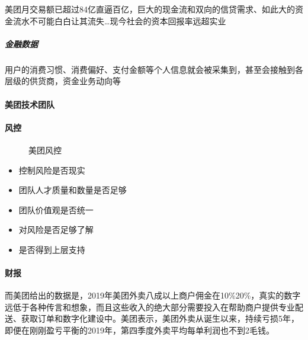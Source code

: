 \documentclass[letterpaper,11pt,english]{sphinxmanual}
\begin{document}
美团月交易额已超过84亿直逼百亿，巨大的现金流和双向的信贷需求、如此大的资金流水不可能白白让其流失…现今社会的资本回报率远超实业%
\begin{footnote}[925]\sphinxAtStartFootnote
{}
%
\end{footnote}


\subparagraph{金融数据}
\label{\detokenize{chapter_company/meituan:id16}}
用户的消费习惯、消费偏好、支付金额等个人信息就会被采集到，甚至会接触到各层级的供货商，资金业务动向等%
\begin{footnote}[926]\sphinxAtStartFootnote
{}
%
\end{footnote}


\paragraph{美团技术团队}
\label{\detokenize{chapter_company/meituan:id17}}


\paragraph{风控}
\label{\detokenize{chapter_company/meituan:id18}}
\begin{figure}[H]
\centering
\capstart

\noindent{}
\caption{美团风控}\label{\detokenize{chapter_company/meituan:id28}}\label{\detokenize{chapter_company/meituan:id19}}\end{figure}
\begin{itemize}
\item {} 
控制风险是否现实

\item {} 
团队人才质量和数量是否足够

\item {} 
团队价值观是否统一

\item {} 
对风险是否足够了解

\item {} 
是否得到上层支持

\end{itemize}


\paragraph{财报}
\label{\detokenize{chapter_company/meituan:id20}}
而美团给出的数据是，2019年美团外卖八成以上商户佣金在10\%\sphinxhyphen{}20\%，真实的数字远低于各种传言和想象，而且这些收入的绝大部分需要投入在帮助商户提供专业配送、获取订单和数字化建设中。美团表示，美团外卖从诞生以来，持续亏损5年，即便在刚刚盈亏平衡的2019年，第四季度外卖平均每单利润也不到2毛钱。
\end{document}
